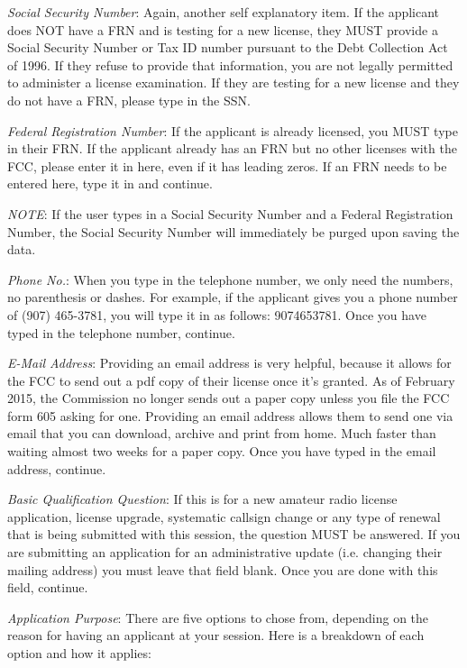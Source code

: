 \begin{DoxyItemize}
\item {\itshape Social Security Number}\+: Again, another self explanatory item. If the applicant does N\+OT have a F\+RN and is testing for a new license, they M\+U\+ST provide a Social Security Number or Tax ID number pursuant to the Debt Collection Act of 1996. If they refuse to provide that information, you are not legally permitted to administer a license examination. If they are testing for a new license and they do not have a F\+RN, please type in the S\+SN.
\item {\itshape Federal Registration Number}\+: If the applicant is already licensed, you M\+U\+ST type in their F\+RN. If the applicant already has an F\+RN but no other licenses with the F\+CC, please enter it in here, even if it has leading zeros. If an F\+RN needs to be entered here, type it in and continue.
\begin{DoxyItemize}
\item {\itshape N\+O\+TE}\+: If the user types in a Social Security Number and a Federal Registration Number, the Social Security Number will immediately be purged upon saving the data.
\end{DoxyItemize}
\item {\itshape Phone No.}\+: When you type in the telephone number, we only need the numbers, no parenthesis or dashes. For example, if the applicant gives you a phone number of (907) 465-\/3781, you will type it in as follows\+: 9074653781. Once you have typed in the telephone number, continue.
\item {\itshape E-\/\+Mail Address}\+: Providing an email address is very helpful, because it allows for the F\+CC to send out a pdf copy of their license once it’s granted. As of February 2015, the Commission no longer sends out a paper copy unless you file the F\+CC form 605 asking for one. Providing an email address allows them to send one via email that you can download, archive and print from home. Much faster than waiting almost two weeks for a paper copy. Once you have typed in the email address, continue.
\item {\itshape Basic Qualification Question}\+: If this is for a new amateur radio license application, license upgrade, systematic callsign change or any type of renewal that is being submitted with this session, the question M\+U\+ST be answered. If you are submitting an application for an administrative update (i.\+e. changing their mailing address) you must leave that field blank. Once you are done with this field, continue.
\item {\itshape Application Purpose}\+: There are five options to chose from, depending on the reason for having an applicant at your session. Here is a breakdown of each option and how it applies\+:

\end{DoxyItemize}
